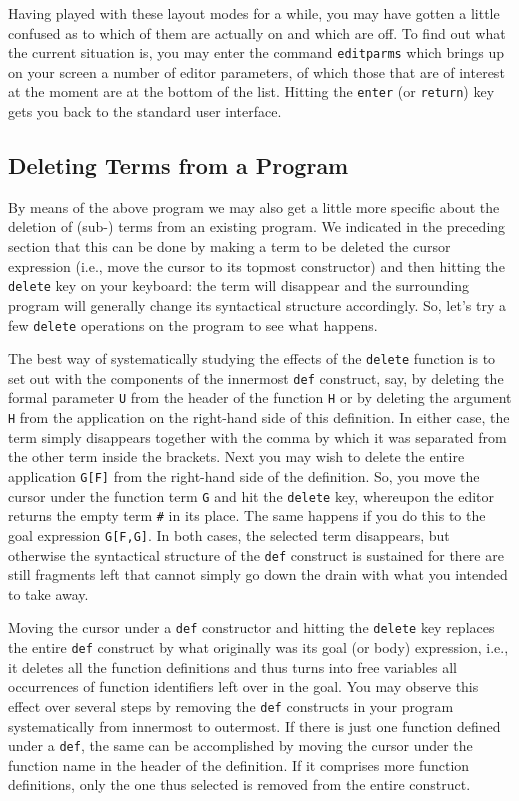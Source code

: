Having played with these layout modes for a while, you may have gotten a little confused as to which of them are actually on and which are off. To find out
what the current situation is, you may enter the command {\tt editparms}
which brings up on your screen a number of {\mys editor parameters}, of
which those that are of interest at the moment are at the bottom of the list.
Hitting the {\tt enter} (or {\tt return}) key gets you back to the 
standard \pired user interface. 

\subsection{Deleting Terms from a \kir Program}

By means of the above program we may also get a little more specific
 about the {\mys deletion} of  (sub-)
 terms from an existing program. We indicated in the
preceding section that this can be done by
making a term to be deleted the cursor expression (i.e., move
the cursor to its topmost constructor) and then hitting the {\tt delete}
key on your keyboard: the term will disappear and the surrounding 
program will generally change its syntactical structure accordingly. So, let's
try a few {\tt delete} operations on the program to see what happens.

The best way of systematically studying the effects of the {\tt delete}
function  is to
 set out with the components of the innermost {\tt def} construct,
say, by deleting the formal parameter {\tt U} from the header of the
function {\tt H} or by deleting the argument {\tt H} from the application
on the right-hand side of this definition. In either case, the term simply
disappears together with the comma by which it was separated from the
other term inside the brackets. Next you may wish to delete the entire
application {\tt G[F]} from the right-hand side of the definition. So,
you move the cursor under the function term {\tt G} and hit the {\tt delete}
key, whereupon the editor returns the empty term {\tt \#} in its place.
The same happens if you do this to the goal expression {\tt G[F,G]}. In both
cases, the selected term disappears, but otherwise the syntactical 
structure of the {\tt def} construct is sustained for there are still
fragments left that cannot simply go down the drain with what you 
intended to take away. 

Moving the cursor under a {\tt def} constructor and hitting the {\tt delete}
key replaces the entire {\tt def} construct by what originally was its
goal (or body) expression, i.e., it deletes all the function definitions
and thus turns into free variables all occurrences of function identifiers
left over in the goal. You may observe this effect over several steps
 by removing the {\tt def}
constructs in your program systematically from innermost to outermost.
If there is just one function defined under a {\tt def}, the same 
can be accomplished by moving the cursor under the function name
in the header of the definition. If it comprises more
function definitions, only the one thus selected
is removed from the entire construct.

